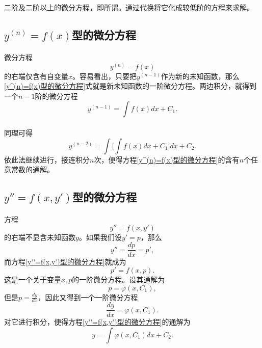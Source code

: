 二阶及二阶以上的微分方程，即所谓。通过代换将它化成较低阶的方程来求解。

\subsection[y＾(n)=f(x) 型的微分方程]{$y^{(n)}=f(x)$型的微分方程}
\paragraph{}
微分方程
\begin{equation}
  \label{y^(n)=f(x)型的微分方程}
  y^{(n)}=f(x)
\end{equation}
的右端仅含有自变量$x$。容易看出，只要把$y^{(n-1)}$作为新的未知函数，那么\eqref{y^(n)=f(x)型的微分方程}式就是新未知函数的一阶微分方程。两边积分，就得到一个$n-1$阶的微分方程
\begin{equation*}
  y^{(n-1)} = \int f(x)dx + C_1.
\end{equation*}

\paragraph{}
同理可得
\begin{equation*}
  y^{(n-2)} = \int\big[ \int f(x)dx + C_1 \big]dx + C_2.
\end{equation*}
依此法继续进行，接连积分$n$次，便得方程\eqref{y^(n)=f(x)型的微分方程}的含有$n$个任意常数的通解。

\subsection{$y''=f(x,y')$型的微分方程}
\paragraph{}
方程
\begin{equation}
  \label{y''=f(x,y')型的微分方程}
  y'' = f(x,y')
\end{equation}
的右端不显含未知函数$y$。如果我们设$y'=p$，那么
\begin{equation*}
  y'' = \frac{dp}{dx} = p',
\end{equation*}
而方程\eqref{y''=f(x,y')型的微分方程}就成为
\begin{equation*}
  p' = f(x,p).
\end{equation*}
这是一个关于变量$x, p$的一阶微分方程。设其通解为
\begin{equation*}
  p = \varphi(x,C_1),
\end{equation*}
但是$\displaystyle p = \frac{dy}{dx}$，因此又得到一个一阶微分方程
\begin{equation*}
  \frac{dy}{dx} = \varphi(x,C_1).
\end{equation*}
对它进行积分，便得方程\eqref{y''=f(x,y')型的微分方程}的通解为
\begin{equation*}
  y = \int\varphi(x,C_1)dx + C_2.
\end{equation*}

